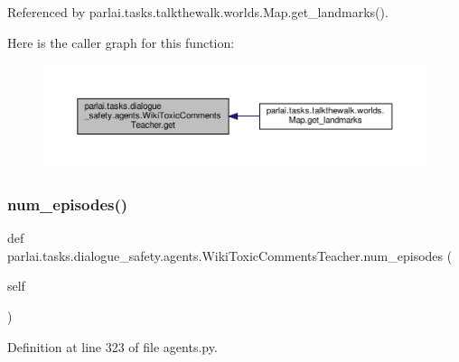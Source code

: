 Referenced by parlai.\+tasks.\+talkthewalk.\+worlds.\+Map.\+get\+\_\+landmarks().

Here is the caller graph for this function\+:
\nopagebreak
\begin{figure}[H]
\begin{center}
\leavevmode
\includegraphics[width=350pt]{classparlai_1_1tasks_1_1dialogue__safety_1_1agents_1_1WikiToxicCommentsTeacher_a036126fb8ba0cb0dcd665a5b6bd4966f_icgraph}
\end{center}
\end{figure}
\mbox{\label{classparlai_1_1tasks_1_1dialogue__safety_1_1agents_1_1WikiToxicCommentsTeacher_a91737afc71227b1eb490648106b2a73c}} 
\subsubsection{\texorpdfstring{num\+\_\+episodes()}{num\_episodes()}}
{\footnotesize\ttfamily def parlai.\+tasks.\+dialogue\+\_\+safety.\+agents.\+Wiki\+Toxic\+Comments\+Teacher.\+num\+\_\+episodes (\begin{DoxyParamCaption}\item[{}]{self }\end{DoxyParamCaption})}



Definition at line 323 of file agents.\+py.



